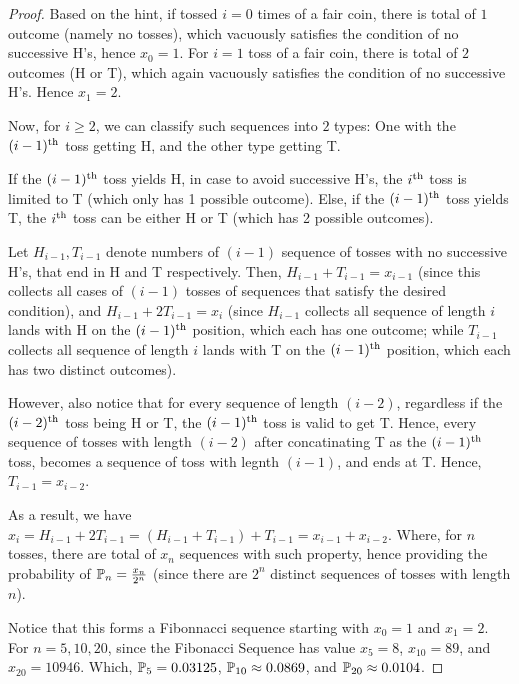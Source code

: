 \documentclass{article}
\begin{document}
\begin{proof}
    Based on the hint, if tossed $i=0$ times of a fair coin, there is total of $1$ outcome (namely no tosses), which vacuously satisfies the condition of no successive H's, hence $x_0=1$. For $i=1$ toss of a fair coin, there is total of $2$ outcomes (H or T), which again vacuously satisfies the condition of no successive H's. Hence $x_1=2$.

    Now, for $i\geq 2$, we can classify such sequences into $2$ types: One with the $(i-1)^\textmd{th}$ toss getting H, and the other type getting T.

    If the $(i-1)^\textmd{th}$ toss yields H, in case to avoid successive H's, the $i^\textmd{th}$ toss is limited to T (which only has 1 possible outcome). Else, if the $(i-1)^\textmd{th}$ toss yields T, the $i^\textmd{th}$ toss can be either H or T (which has 2 possible outcomes).

    Let $H_{i-1}, T_{i-1}$ denote numbers of $(i-1)$ sequence of tosses with no successive H's, that end in H and T respectively. Then, $H_{i-1}+T_{i-1} = x_{i-1}$ (since this collects all cases of $(i-1)$ tosses of sequences that satisfy the desired condition), and $H_{i-1}+2 T_{i-1}=x_i$ (since $H_{i-1}$ collects all sequence of length $i$ lands with H on the $(i-1)^\textmd{th}$ position, which each has one outcome; while $T_{i-1}$ collects all sequence of length $i$ lands with T on the $(i-1)^\textmd{th}$ position, which each has two distinct outcomes).

    However, also notice that for every sequence of length $(i-2)$, regardless if the $(i-2)^\textmd{th}$ toss being H or T, the $(i-1)^\textmd{th}$ toss is valid to get T. Hence, every sequence of tosses with length $(i-2)$ after concatinating T as the $(i-1)^\textmd{th}$ toss, becomes a sequence of toss with legnth $(i-1)$, and ends at T. Hence, $T_{i-1} = x_{i-2}$.

    As a result, we have $x_i=H_{i-1}+2 T_{i-1} = (H_{i-1}+T_{i-1})+T_{i-1}=x_{i-1}+x_{i-2}$. Where, for $n$ tosses, there are total of $x_n$ sequences with such property, hence providing the probability of $\mathbb{P}_n=\frac{x_n}{2^n}$ (since there are $2^n$ distinct sequences of tosses with length $n$).

    \hfil

    Notice that this forms a Fibonnacci sequence starting with $x_0=1$ and $x_1=2$. For $n=5,10,20$, since the Fibonacci Sequence has value $x_5=8$, $x_{10}=89$, and $x_{20}=10946$. Which, $\mathbb{P}_5 = 0.03125$, $\mathbb{P}_{10}\approx 0.0869$, and $\mathbb{P}_{20}\approx 0.0104$.
\end{proof}
\end{document}
